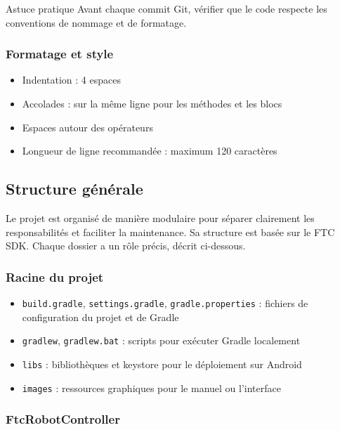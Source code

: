 \documentclass[12pt, a4paper]{report}
\begin{document}
    \begin{myinfo}{Astuce pratique}
        Avant chaque commit Git, vérifier que le code respecte les conventions de nommage et de formatage.
    \end{myinfo}

    \subsubsection*{Formatage et style}
    \begin{itemize}
        \item Indentation : 4 espaces
        \item Accolades : sur la même ligne pour les méthodes et les blocs
        \item Espaces autour des opérateurs
        \item Longueur de ligne recommandée : maximum 120 caractères
    \end{itemize}

    \subsection{Structure générale}

    Le projet est organisé de manière modulaire pour séparer clairement les responsabilités et faciliter la maintenance. Sa structure est basée sur le FTC SDK. Chaque dossier a un rôle précis, décrit ci-dessous.

    \subsubsection*{Racine du projet}
    \begin{itemize}
        \item \texttt{build.gradle}, \texttt{settings.gradle}, \texttt{gradle.properties} : fichiers de configuration du projet et de Gradle
        \item \texttt{gradlew}, \texttt{gradlew.bat} : scripts pour exécuter Gradle localement
        \item \texttt{libs} : bibliothèques et keystore pour le déploiement sur Android
        \item \texttt{images} : ressources graphiques pour le manuel ou l'interface
    \end{itemize}


    \subsubsection*{FtcRobotController}
\end{document}
